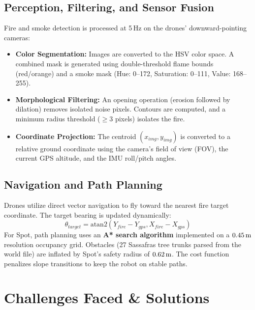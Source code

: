 \documentclass[11pt,a4paper]{article}
\begin{document}
\subsection{Perception, Filtering, and Sensor Fusion}
Fire and smoke detection is processed at 5\,Hz on the drones' downward-pointing cameras:
\begin{itemize}
  \item \textbf{Color Segmentation:} Images are converted to the HSV color space. A combined mask is generated using double-threshold flame bounds (red/orange) and a smoke mask (Hue: 0--172, Saturation: 0--111, Value: 168--255).
  \item \textbf{Morphological Filtering:} An opening operation (erosion followed by dilation) removes isolated noise pixels. Contours are computed, and a minimum radius threshold ($\ge 3$ pixels) isolates the fire.
  \item \textbf{Coordinate Projection:} The centroid $(x_{img}, y_{img})$ is converted to a relative ground coordinate using the camera's field of view (FOV), the current GPS altitude, and the IMU roll/pitch angles.
\end{itemize}

\subsection{Navigation and Path Planning}
Drones utilize direct vector navigation to fly toward the nearest fire target coordinate. The target bearing is updated dynamically:
\begin{equation}
  \theta_{target} = \text{atan2}(Y_{fire} - Y_{gps}, X_{fire} - X_{gps})
\end{equation}
For Spot, path planning uses an \textbf{A* search algorithm} implemented on a $0.45\text{\,m}$ resolution occupancy grid. Obstacles (27 Sassafras tree trunks parsed from the world file) are inflated by Spot's safety radius of $0.62\text{\,m}$. The cost function penalizes slope transitions to keep the robot on stable paths.

\section{Challenges Faced \& Solutions}
\end{document}
